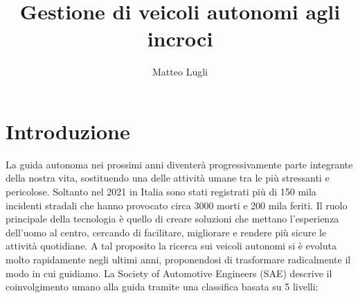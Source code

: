 \documentclass[letterpaper, 12pt]{article}
\author{Matteo Lugli}
\date{}
\title{Gestione di veicoli autonomi agli incroci}
\begin{document}
\maketitle
\tableofcontents

\newpage
\section{Introduzione}
\label{sec:orgc7851ce}
La guida autonoma nei prossimi anni diventerà progressivamente parte
integrante della nostra vita, sostituendo una delle attività umane 
tra le più stressanti e pericolose. 
Soltanto nel 2021 in Italia sono stati registrati più di 150 mila incidenti
stradali che hanno provocato circa 3000 morti e 200 mila feriti.
Il ruolo principale della tecnologia è quello di creare soluzioni che mettano
l'esperienza dell'uomo al centro, cercando di facilitare, migliorare e rendere 
più sicure le attività quotidiane.
A tal proposito la ricerca sui veicoli autonomi si è evoluta molto rapidamente negli ultimi anni,
proponendosi di trasformare radicalmente il modo in cui guidiamo.
La Society of Automotive Engineers (SAE) descrive il coinvolgimento umano alla guida tramite
una classifica basata su 5 livelli:
\end{document}
